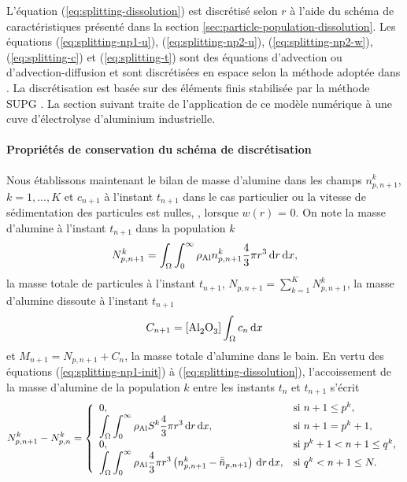 L'équation (\ref{eq:splitting-dissolution}) est discrétisé selon $r$
à l'aide du schéma de caractéristiques présenté dans la section
\ref{sec:particle-population-dissolution}. Les équations
(\ref{eq:splitting-np1-u}), (\ref{eq:splitting-np2-u}),
(\ref{eq:splitting-np2-w}), (\ref{eq:splitting-c}) et
(\ref{eq:splitting-t}) sont des équations d'advection ou
d'advection-diffusion et sont discrétisées en espace selon la
méthode adoptée dans \cite{Hofer2011}. La discrétisation est basée
sur des éléments finis stabilisée par la méthode SUPG
\cite{Quarteroni2008}. La section suivant traite de l'application de
ce modèle numérique à une cuve d'électrolyse d'aluminium industrielle.

\paragraph{Propriétés de conservation du schéma de discrétisation}
Nous établissons maintenant le bilan de masse d'alumine dans les
champs $n_{p,n+1}^k$, $k = 1,\dots, K$ et $c_{n+1}$ à l'instant
$t_{n+1}$ dans le cas particulier ou la vitesse de sédimentation des
particules est nulles, \ie, lorsque $w(r)$ = 0. On note la masse
d'alumine à l'instant $t_{n+1}$ dans la population $k$
\begin{equation}\label{eq:np-masse-def}
  N_{p,n+1}^k = \int_\Omega\int_0^\infty \rho_\mathrm{Al}
  n_{p,n+1}^k\frac{4}{3}\pi r^3\,\mathrm dr\,\mathrm dx,
\end{equation}
la masse totale de particules à l'instant $t_{n+1}$, $N_{p,n+1} =
\sum_{k = 1}^K N_{p,n+1}^k$, la masse d'alumine dissoute à l'instant $t_{n+1}$
\begin{equation}\label{eq:c-masse-def}
  C_{n+1} = [\cee{Al2O3}]\int_\Omega c_n\intd{x}
\end{equation}
et $M_{n+1} = N_{p,n+1} + C_n$, la masse totale d'alumine dans le
bain. En vertu des équations (\ref{eq:splitting-np1-init}) à
(\ref{eq:splitting-dissolution}), l'accoissement de la masse d'alumine
de la population $k$ entre les instants $t_{n}$ et $t_{n + 1}$ s'écrit
\begin{equation}\label{eq:np-accr}
  N_{p,n+1}^k - N_{p,n}^k = \left\{
  \begin{array}{ll}
    0, & \text{si }n+1 \leq p^k, \\
    \displaystyle\int_\Omega\displaystyle\int_0^\infty \rho_\mathrm{Al} S^k\frac{4}{3}\pi
    r^3\,\mathrm dr\,\mathrm dx, & \text{si }n+1 = p^k + 1, \\
    0, & \text{si }p^k+1 < n+1 \leq q^k, \\
    \displaystyle\int_\Omega\displaystyle\int_0^\infty \rho_\mathrm{Al} \frac{4}{3}\pi
    r^3\left( n_{p,n+1}^k - \bar{\bar n}_{p,n+1} \right)\,\mathrm dr\,\mathrm dx, &\text{si } q^k < n+1 \leq N.
  \end{array}
  \right.
\end{equation}
